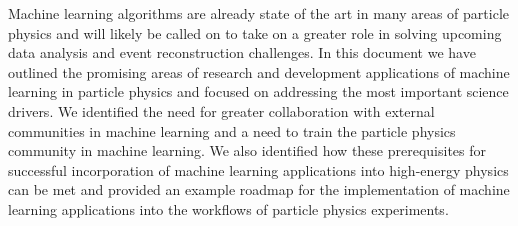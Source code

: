 
Machine learning algorithms are already state of the art in many areas of particle physics and will likely be called on to take on a greater role in solving upcoming data analysis and event reconstruction challenges.
In this document we have outlined the promising areas of research and development applications of machine learning in particle physics and focused on addressing the most important science drivers.
We identified the need for greater collaboration with external communities in machine learning and a need to train the particle physics community in machine learning.
We also identified how these prerequisites for successful incorporation of machine learning applications into high-energy physics  can be met and provided an example roadmap for the implementation of machine learning applications into the workflows of particle physics experiments.
